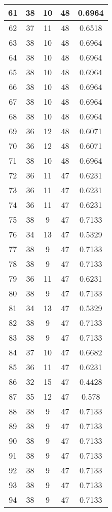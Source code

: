 \documentclass[letterpaper, 12pt]{article}
\begin{document}
\begin{longtable}{|c|c|c|c|c|}
\hline
61 & 38 & 10 & 48 & 0.6964 \\
\hline
62 & 37 & 11 & 48 & 0.6518 \\
\hline
63 & 38 & 10 & 48 & 0.6964 \\
\hline
64 & 38 & 10 & 48 & 0.6964 \\
\hline
65 & 38 & 10 & 48 & 0.6964 \\
\hline
66 & 38 & 10 & 48 & 0.6964 \\
\hline
67 & 38 & 10 & 48 & 0.6964 \\
\hline
68 & 38 & 10 & 48 & 0.6964 \\
\hline
69 & 36 & 12 & 48 & 0.6071 \\
\hline
70 & 36 & 12 & 48 & 0.6071 \\
\hline
71 & 38 & 10 & 48 & 0.6964 \\
\hline
72 & 36 & 11 & 47 & 0.6231 \\
\hline
73 & 36 & 11 & 47 & 0.6231 \\
\hline
74 & 36 & 11 & 47 & 0.6231 \\
\hline
75 & 38 & 9 & 47 & 0.7133 \\
\hline
76 & 34 & 13 & 47 & 0.5329 \\
\hline
77 & 38 & 9 & 47 & 0.7133 \\
\hline
78 & 38 & 9 & 47 & 0.7133 \\
\hline
79 & 36 & 11 & 47 & 0.6231 \\
\hline
80 & 38 & 9 & 47 & 0.7133 \\
\hline
81 & 34 & 13 & 47 & 0.5329 \\
\hline
82 & 38 & 9 & 47 & 0.7133 \\
\hline
83 & 38 & 9 & 47 & 0.7133 \\
\hline
84 & 37 & 10 & 47 & 0.6682 \\
\hline
85 & 36 & 11 & 47 & 0.6231 \\
\hline
86 & 32 & 15 & 47 & 0.4428 \\
\hline
87 & 35 & 12 & 47 & 0.578 \\
\hline
88 & 38 & 9 & 47 & 0.7133 \\
\hline
89 & 38 & 9 & 47 & 0.7133 \\
\hline
90 & 38 & 9 & 47 & 0.7133 \\
\hline
91 & 38 & 9 & 47 & 0.7133 \\
\hline
92 & 38 & 9 & 47 & 0.7133 \\
\hline
93 & 38 & 9 & 47 & 0.7133 \\
\hline
94 & 38 & 9 & 47 & 0.7133 \\

\end{longtable}
\end{document}
